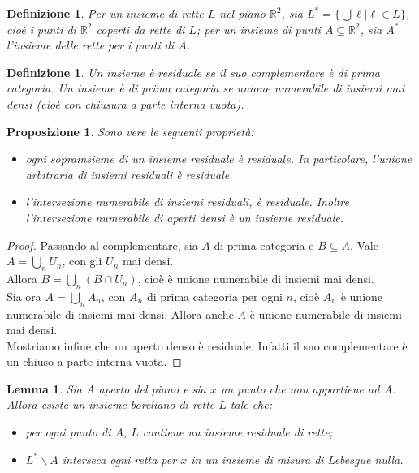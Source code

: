 \documentclass[a4paper, twoside,openright]{article}
\newcommand{\R}{\mathbb{R}}
\newcommand{\<}{\langle}
\renewcommand{\>}{\rangle}
\newtheorem{lemma}[teo]{Lemma}
\newtheorem{defin}[teo]{Definizione}
\newtheorem{prop}[teo]{Proposizione}
\begin{document}
\begin{defin}
Per un insieme di rette $L$ nel piano $\R^2$, sia $L^{*}= \{\bigcup \ell | \ell \in L\}$, cioè i punti di $\R^2$ coperti da rette di $L$; per un insieme di punti $A \subseteq \R^2$, sia $A^{*}$ l'insieme delle rette per i punti di $A$.
\end{defin}

\begin{defin}
	Un insieme è residuale se il suo complementare è di prima categoria. Un insieme è di prima categoria se unione numerabile di insiemi mai densi (cioè con chiusura a parte interna vuota).
\end{defin}

\begin{prop}
	Sono vere le seguenti proprietà:
	\begin{itemize}
		\item ogni soprainsieme di un insieme residuale è residuale. In particolare, l'unione arbitraria di insiemi residuali è residuale.
		\item l'intersezione numerabile di insiemi residuali, è residuale. Inoltre l'intersezione numerabile di aperti densi è un insieme residuale.
	\end{itemize}
\end{prop}
\begin{proof}
	Passando al complementare, sia $A$ di prima categoria e $B \subseteq A$. Vale $A= \bigcup_n U_n$, con gli $U_n$ mai densi.\\
	Allora $B= \bigcup_n(B \cap U_n)$, cioè è unione numerabile di insiemi mai densi.\\
	Sia ora $A=\bigcup_nA_n$, con $A_n$ di prima categoria per ogni $n$, cioè $A_n$ è unione numerabile di insiemi mai densi. Allora anche $A$ è unione numerabile di insiemi mai densi.\\
	Mostriamo infine che un aperto denso è residuale. Infatti il suo complementare è un chiuso a parte interna vuota.	
\end{proof}

\begin{lemma} \label{lemma1}
Sia $A$ aperto del piano e sia $x$ un punto che non appartiene ad $A$. Allora esiste un insieme boreliano di rette $L$ tale che:
\begin{itemize}
	\item per ogni punto di $A$, $L$ contiene un insieme residuale di rette;
	\item $L^{*} \backslash A$ interseca ogni retta per $x$ in un insieme di misura di Lebesgue nulla.
\end{itemize}
\end{lemma}
\end{document}
